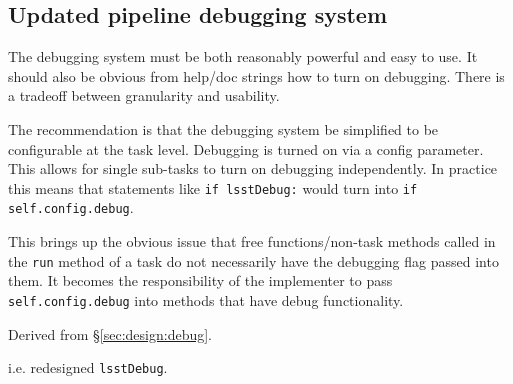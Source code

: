 \subsection{Updated pipeline debugging system}
\label{sec:comp:debug}


The debugging system must be both reasonably powerful and easy to use.
It should also be obvious from help/doc strings how to turn on debugging.
There is a tradeoff between granularity and usability.

The recommendation is that the debugging system be simplified to be configurable at the task level.
Debugging is turned on via a config parameter.
This allows for single sub-tasks to turn on debugging independently.
In practice this means that statements like \texttt{if lsstDebug:} would turn into \texttt{if self.config.debug}.

This brings up the obvious issue that free functions/non-task methods called in the \texttt{run} method of a task do not necessarily have the debugging flag passed into them.
It becomes the responsibility of the implementer to pass \texttt{self.config.debug} into methods that have debug functionality.

Derived from \S\ref{sec:design:debug}.

i.e. redesigned \texttt{lsstDebug}.

